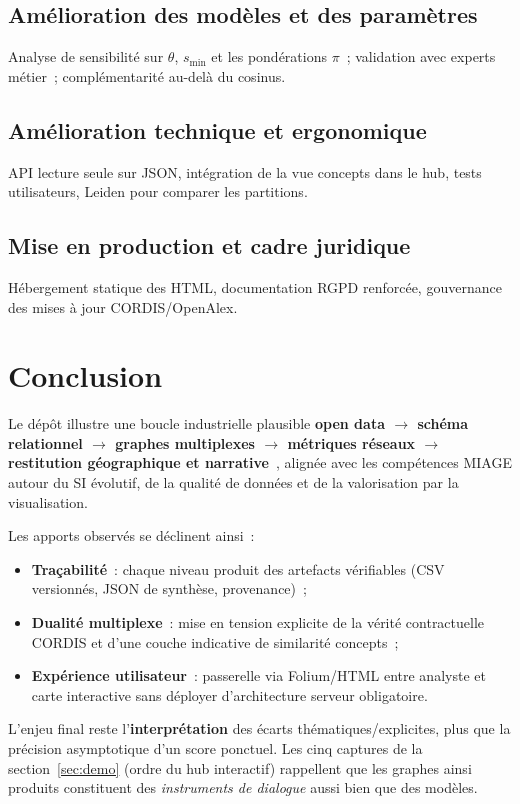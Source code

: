\documentclass[12pt,a4paper,oneside]{article}
\begin{document}
\subsection{Amélioration des modèles et des paramètres}
Analyse de sensibilité sur $\theta$, $s_{\min}$ et les pondérations $\pi$~; validation avec experts métier~; complémentarité au-delà du cosinus.

\subsection{Amélioration technique et ergonomique}
API lecture seule sur JSON, intégration de la vue concepts dans le hub, tests utilisateurs, Leiden pour comparer les partitions.

\subsection{Mise en production et cadre juridique}
Hébergement statique des HTML, documentation RGPD renforcée, gouvernance des mises à jour CORDIS/OpenAlex.
\newpage
\section{Conclusion}
Le dépôt illustre une boucle industrielle plausible \textbf{open data $\rightarrow$ schéma relationnel $\rightarrow$ graphes multiplexes $\rightarrow$ métriques réseaux $\rightarrow$ restitution géographique et narrative}~\cite{newman2010,fortunato2010}, alignée avec les compétences MIAGE autour du SI évolutif, de la qualité de données et de la valorisation par la visualisation.

Les apports observés se déclinent ainsi~:
\begin{itemize}[nosep]
  \item \textbf{Traçabilité}~: chaque niveau produit des artefacts vérifiables (CSV versionnés, JSON de synthèse, provenance)~;
  \item \textbf{Dualité multiplexe}~: mise en tension explicite de la vérité contractuelle CORDIS et d'une couche indicative de similarité concepts~;
  \item \textbf{Expérience utilisateur}~: passerelle via Folium/HTML entre analyste et carte interactive sans déployer d'architecture serveur obligatoire.
\end{itemize}

L'enjeu final reste l'\textbf{interprétation} des écarts thématiques/explicites, plus que la précision asymptotique d'un score ponctuel. Les cinq captures de la section~\ref{sec:demo} (ordre du hub interactif) rappellent que les graphes ainsi produits constituent des \emph{instruments de dialogue} aussi bien que des modèles.
\end{document}
